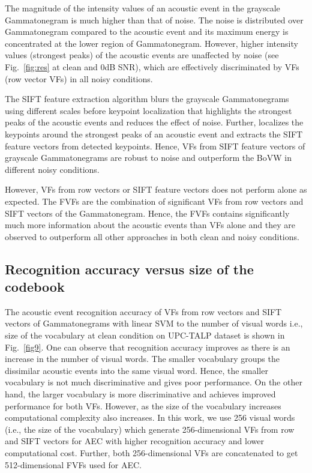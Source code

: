\documentclass[a4paper]{article}
\begin{document}
The magnitude of the intensity values of an acoustic event in
the grayscale Gammatonegram is much higher than that of noise. The
noise is distributed over Gammatonegram compared to the acoustic
event and its maximum energy is concentrated at the lower region of Gammatonegram. However, higher intensity values (strongest peaks) of the acoustic events are unaffected by noise (see Fig.~\ref{fig:res} at clean and 0dB SNR), which are effectively
discriminated by VFs (row vector VFs) in all noisy conditions. 

The SIFT feature extraction algorithm blurs the grayscale Gammatonegrams using different scales before keypoint localization that highlights the strongest peaks of the acoustic events and reduces the effect of noise. Further, localizes the keypoints around the strongest peaks of an acoustic event and extracts the SIFT feature vectors from detected keypoints. Hence, VFs from SIFT feature vectors of grayscale Gammatonegrams are robust to noise and outperform the BoVW in different noisy conditions.

However, VFs from row vectors or SIFT feature vectors does not perform alone as expected. The FVFs are the combination of significant VFs from row vectors and SIFT vectors of the Gammatonegram. Hence, the
FVFs contains significantly much more information about the acoustic events than VFs alone and they are observed to outperform all other approaches in both clean and noisy conditions.
\subsection{Recognition accuracy versus size of the codebook} 
The acoustic event recognition accuracy of
VFs from row vectors and SIFT vectors of Gammatonegrams with linear SVM to the number of visual words
i.e., size of the vocabulary at clean condition on UPC-TALP dataset is shown in
Fig.~\ref{fig9}. One can observe that recognition accuracy improves as
there is an increase in the number of visual words. The smaller
vocabulary groups the dissimilar acoustic events into the same
visual word. Hence, the smaller vocabulary is not much discriminative
and gives poor performance. On the other hand, the larger
vocabulary is more discriminative and achieves improved performance for both VFs. However, as the size of the vocabulary increases
computational complexity also increases. In this work, we
use 256 visual words (i.e., the size of the vocabulary) which generate
256-dimensional VFs from row and SIFT vectors for AEC with
higher recognition accuracy and lower computational cost. 
Further, both 256-dimensional VFs are concatenated to get 512-dimensional FVFs used for AEC.
\end{document}
